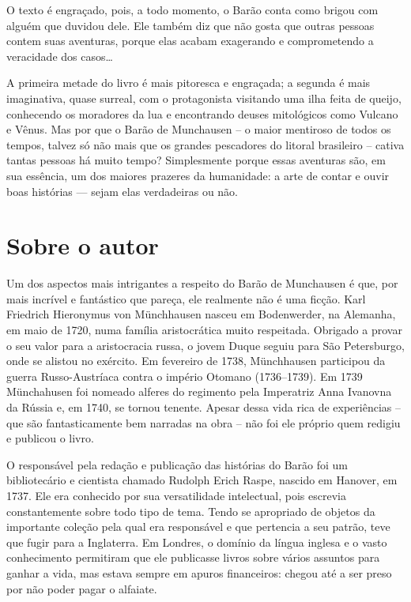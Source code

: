 \documentclass[11pt]{extarticle}
\begin{document}
O texto é engraçado, pois, a todo momento, o Barão conta como brigou com alguém que duvidou dele. Ele também diz que não gosta que outras pessoas contem suas aventuras, porque elas acabam exagerando e comprometendo a veracidade dos casos… 

A primeira metade do livro é mais pitoresca e engraçada; a segunda é mais imaginativa, quase surreal, com o protagonista visitando uma ilha feita de queijo, conhecendo os moradores da lua e encontrando deuses mitológicos como Vulcano e Vênus. Mas por que o Barão de Munchausen -- o maior mentiroso de todos os tempos, talvez só não mais que os grandes pescadores do litoral brasileiro -- cativa tantas pessoas há muito tempo? Simplesmente porque essas aventuras são, em sua essência, um dos maiores prazeres da humanidade: a arte de contar e ouvir boas histórias — sejam elas verdadeiras ou não. 


\section{Sobre o autor}

Um dos aspectos mais intrigantes a respeito do Barão de Munchausen é que, por mais incrível e fantástico que pareça, ele realmente não é uma ficção. Karl Friedrich Hieronymus von Münchhausen nasceu em Bodenwerder, na Alemanha, em maio de 1720, numa família aristocrática muito respeitada. Obrigado a provar o seu valor para a aristocracia russa, o jovem Duque seguiu para São Petersburgo, onde se alistou no exército. Em fevereiro de 1738, Münchhausen participou da guerra Russo-Austríaca contra o império Otomano (1736–1739). Em 1739 Münchahusen foi nomeado alferes do regimento pela Imperatriz Anna Ivanovna da Rússia e, em 1740, se tornou tenente. Apesar dessa vida rica de experiências -- que são fantasticamente bem narradas na obra -- não foi ele próprio quem redigiu e publicou o livro. 

O responsável pela redação e publicação das histórias do Barão foi um bibliotecário e cientista chamado Rudolph Erich Raspe, nascido em Hanover, em 1737. Ele era conhecido por sua versatilidade intelectual, pois escrevia constantemente sobre todo tipo de tema. Tendo se apropriado de objetos da importante coleção pela qual era responsável e que pertencia a seu patrão, teve que fugir para a Inglaterra. Em Londres, o domínio da língua inglesa e o vasto conhecimento permitiram que ele publicasse livros sobre vários assuntos para ganhar a vida, mas estava sempre em apuros financeiros: chegou até a ser preso por não poder pagar o alfaiate. 
\end{document}
